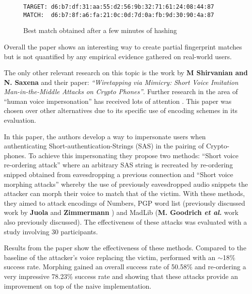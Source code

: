 \begin{figure}[!h]
    \begin{center}
        \verb|TARGET: d6:b7:df:31:aa:55:d2:56:9b:32:71:61:24:08:44:87|
        \verb|MATCH:  d6:b7:8f:a6:fa:21:0c:0d:7d:0a:fb:9d:30:90:4a:87|
    \end{center}
    \caption{Best match obtained after a few minutes of hashing}
    \label{ref:fuzz}
\end{figure}

Overall the paper shows an interesting way to create partial fingerprint matches but is not quantified by any empirical evidence gathered on real-world users. 

The only other relevant research on this topic is the work by \textbf{M Shirvanian and N. Saxena}\cite{shirvanian2014wiretapping} 
and their paper: \textit{``Wiretapping via Mimicry: Short 
Voice Imitation Man-in-the-Middle Attacks on Crypto 
Phones''}. Further research in the area of ``human voice impersonation'' has received lots of attention \cite{mukhopadhyay2015all}\cite{chen2017you}\cite{wu2015spoofing}. This paper was chosen over other alternatives due to its specific use of encoding schemes in its evaluation.

In this paper, the authors develop a way to 
impersonate users when authenticating 
Short-authentication-Strings (SAS) in the pairing of 
Crypto-phones. To achieve this impersonating they propose 
two methods: ``Short voice re-ordering attack'' where an 
arbitrary SAS string is recreated by re-ordering snipped 
obtained from eavesdropping a previous connection
and ``Short voice morphing attacks'' whereby the use of 
previously eavesdropped audio snippets the attacker can
morph their voice to match that of the victim. With 
these methods, they aimed to attack encodings of Numbers, 
PGP word list (previously discussed work by \textbf{Juola} and 
\textbf{Zimmermann} \cite{juola1996whole}) and MadLib (\textbf{M. Goodrich 
\textit{et al.}}\cite{goodrich2006loud} work also 
previously discussed). The effectiveness of these attacks 
was evaluated with a study involving 30 participants.

Results from the paper show the effectiveness of these 
methods. Compared to the baseline of the attacker's voice 
replacing the victim, performed with an $\sim$18\% success rate. Morphing gained an overall success rate of 50.58\% and re-ordering a very impressive 78.23\% success rate and showing that these attacks provide an improvement on top of the naive implementation.

